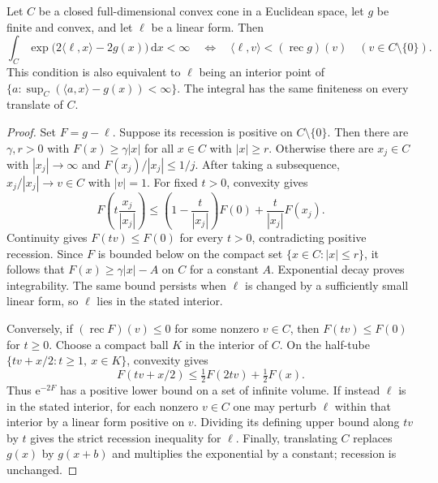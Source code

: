 \begin{lemma}\label{lem:convex-cone-exponential-integrability}
Let $C$ be a closed full-dimensional convex cone in a Euclidean space, let $g$ be finite and convex, and let $\ell$ be a linear form. Then
\[
 \int_C\exp\bigl(2\langle\ell,x\rangle-2g(x)\bigr)\,\mathrm dx<\infty
 \quad\Longleftrightarrow\quad
 \langle\ell,v\rangle<(\operatorname{rec}g)(v)
       \quad(v\in C\setminus\{0\}).
\]
This condition is also equivalent to $\ell$ being an interior point of $\{a:\sup_C(\langle a,x\rangle-g(x))<\infty\}$. The integral has the same finiteness on every translate of $C$.
\end{lemma}
\begin{proof}
Set $F=g-\ell$. Suppose its recession is positive on $C\setminus\{0\}$. Then there are $\gamma,r>0$ with $F(x)\geq\gamma|x|$ for all $x\in C$ with $|x|\geq r$. Otherwise there are $x_j\in C$ with $|x_j|\to\infty$ and $F(x_j)/|x_j|\leq1/j$. After taking a subsequence, $x_j/|x_j|\to v\in C$ with $|v|=1$. For fixed $t>0$, convexity gives
\[
 F\left(t\frac{x_j}{|x_j|}\right)
 \leq\left(1-\frac t{|x_j|}\right)F(0)
       +\frac t{|x_j|}F(x_j).
\]
Continuity gives $F(tv)\leq F(0)$ for every $t>0$, contradicting positive recession. Since $F$ is bounded below on the compact set $\{x\in C:|x|\leq r\}$, it follows that $F(x)\geq\gamma|x|-A$ on $C$ for a constant $A$. Exponential decay proves integrability. The same bound persists when $\ell$ is changed by a sufficiently small linear form, so $\ell$ lies in the stated interior.

Conversely, if $(\operatorname{rec}F)(v)\leq0$ for some nonzero $v\in C$, then $F(tv)\leq F(0)$ for $t\geq0$. Choose a compact ball $K$ in the interior of $C$. On the half-tube $\{tv+x/2:t\geq1,\ x\in K\}$, convexity gives
\[
 F(tv+x/2)\leq\tfrac12F(2tv)+\tfrac12F(x).
\]
Thus $\mathrm e^{-2F}$ has a positive lower bound on a set of infinite volume. If instead $\ell$ is in the stated interior, for each nonzero $v\in C$ one may perturb $\ell$ within that interior by a linear form positive on $v$. Dividing its defining upper bound along $tv$ by $t$ gives the strict recession inequality for $\ell$. Finally, translating $C$ replaces $g(x)$ by $g(x+b)$ and multiplies the exponential by a constant; recession is unchanged.
\end{proof}

